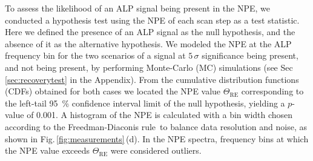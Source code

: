 \documentclass[superscriptaddress,
floatfix,
reprint,
nofootinbib,
amsmath,amssymb,
aps,
prd,
]{revtex4-2}
\begin{document}
To assess the likelihood of an ALP signal being present in the NPE, we conducted a hypothesis test using the NPE of each scan step as a test statistic.
Here we defined the presence of an ALP signal as the null hypothesis, and the absence of it as the alternative hypothesis.
We modeled the NPE at the ALP frequency bin for the two scenarios of a signal at $5\,\sigma$ significance being present, and not being present, by performing Monte-Carlo (MC) simulations (see Sec\,\ref{sec:recoverytest} in the Appendix).
From the cumulative distribution functions (CDFs) obtained for both cases we located the NPE value $\Theta_{\mathrm{RE}}$ corresponding to the left-tail \SI{95}{\%} confidence interval limit of the null hypothesis, yielding a $p$-value of 0.001.
A histogram of the NPE is calculated with a bin width chosen according to the Freedman-Diaconis rule\,\cite{Freedman1981OnTH} to balance data resolution and noise, as shown in Fig.\,\ref{fig:measurements}\,(d).
In the NPE spectra, frequency bins at which the NPE value exceeds $\Theta_{\mathrm{RE}}$ were considered outliers.
\end{document}
